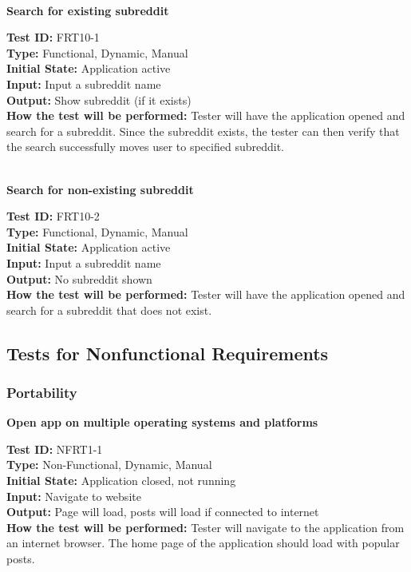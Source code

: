 \documentclass[12pt,fleqn]{article}
\begin{document}
\newpage

\textbf{\\Search for existing subreddit}
\begin{tcolorbox}
\textbf{Test ID:} FRT10-1\\ %
\textbf{Type:} Functional, Dynamic, Manual\\
\textbf{Initial State:} Application active \\
\textbf{Input:} Input a subreddit name \\
\textbf{Output:} Show subreddit (if it exists)\\
\textbf{How the test will be performed:} Tester will have the application opened and search for a subreddit. Since the subreddit exists, the tester can then verify that the search successfully moves user to specified subreddit.
\end{tcolorbox}

\textbf{\\Search for non-existing subreddit}
\begin{tcolorbox}
\textbf{Test ID:} FRT10-2\\
\textbf{Type:} Functional, Dynamic, Manual\\
\textbf{Initial State:} Application active \\
\textbf{Input:} Input a subreddit name \\
\textbf{Output:} No subreddit shown\\
\textbf{How the test will be performed:} Tester will have the application opened and search for a subreddit that does not exist.
\end{tcolorbox}

\subsection{Tests for Nonfunctional Requirements}

\subsubsection{Portability}
		
\textbf{Open app on multiple operating systems and platforms}
\begin{tcolorbox}
\textbf{Test ID:} NFRT1-1\\
\textbf{Type:} Non-Functional, Dynamic, Manual\\
\textbf{Initial State:} Application closed, not running \\
\textbf{Input:} Navigate to website \\
\textbf{Output:} Page will load, posts will load if connected to internet\\
\textbf{How the test will be performed:} Tester will navigate to the application from an internet browser. The home page of the application should load with popular posts.
\end{tcolorbox}
\end{document}
